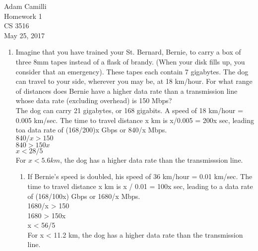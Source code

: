 \message{ !name(Homework_1.tex)}\documentclass[12pt]{article}
\begin{document}

Adam Camilli \\
Homework 1 \\
CS 3516\\
May 25, 2017\\

\begin{enumerate}
\item Imagine that you have trained your St. Bernard, Bernie, to carry a box of three 8mm tapes instead of a flask of brandy. (When your disk fills up, you consider that an emergency). These tapes each contain 7 gigabytes. The dog can travel to your side, wherever you may be, at 18 km/hour. For what range of distances does Bernie have a higher data rate than a transmission line whose data rate (excluding overhead) is 150 Mbps? \\

  The dog can carry 21 gigabytes, or 168 gigabits. A speed of 18 km/hour = 0.005 km/sec. The time to travel distance x km is x/0.005 = 200x sec, leading toa data rate of (168/200)x Gbps or 840/x Mbps. \\
  $840/x > 150$ \\
  $840 > 150x$ \\
  $x < 28/5$ \\
  For $x < 5.6 km$, the dog has a higher data rate than the transmisssion line.
  \begin{enumerate}
  \item If Bernie's speed is doubled, his speed of 36 km/hour = 0.01 km/sec. The time to travel distance x km is x / 0.01 = 100x sec, leading to a data rate of (168/100x) Gbps or 1680/x Mbps. \\
    1680/x > 150 \\
    1680 > 150x \\
    x < 56/5 \\
    For x < 11.2 km, the dog has a higher data rate than the transmission line.
  \end{enumerate}
\end{enumerate}
\end{document}
